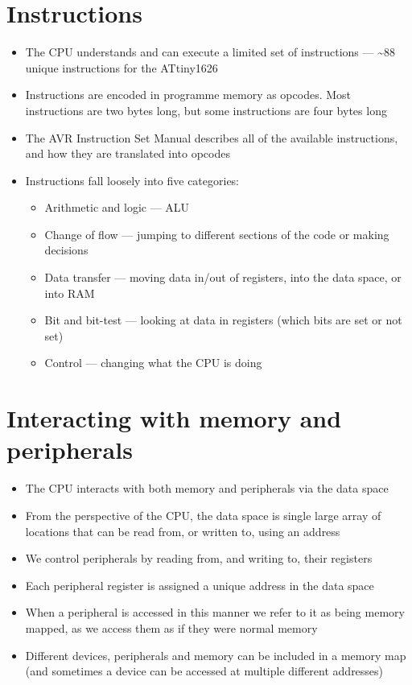 \documentclass{report}
\begin{document}
\section{Instructions}
\begin{itemize}
    \item The CPU understands and can execute a limited set of instructions --- \textasciitilde88 unique instructions for the ATtiny1626
    \item Instructions are encoded in programme memory as opcodes. Most instructions are two bytes long, but some instructions are four bytes long
    \item The AVR Instruction Set Manual describes all of the available instructions, and how they are translated into opcodes
    \item Instructions fall loosely into five categories:
          \begin{itemize}
              \item Arithmetic and logic --- ALU
              \item Change of flow --- jumping to different sections of the code or making decisions
              \item Data transfer --- moving data in/out of registers, into the data space, or into RAM
              \item Bit and bit-test --- looking at data in registers (which bits are set or not set)
              \item Control --- changing what the CPU is doing
          \end{itemize}
\end{itemize}
\section{Interacting with memory and peripherals}
\begin{itemize}
    \item The CPU interacts with both memory and peripherals via the data space
    \item From the perspective of the CPU, the data space is single large array of
          locations that can be read from, or written to, using an address
    \item We control peripherals by reading from, and writing to, their registers
    \item Each peripheral register is assigned a unique address in the data space
    \item When a peripheral is accessed in this manner we refer to it as being
          memory mapped, as we access them as if they were normal memory
    \item Different devices, peripherals and memory can be included in a memory map
          (and sometimes a device can be accessed at multiple different addresses)
\end{itemize}
\end{document}

